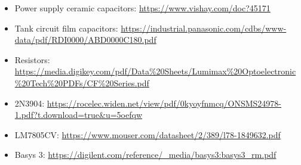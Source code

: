 \documentclass[12pt]{article}
\numberwithin{figure}{section}
\numberwithin{equation}{section}
\begin{document}
\begin{itemize} 
    \item Power supply ceramic capacitors: \url{https://www.vishay.com/doc?45171} 
    \item Tank circuit film capacitors: \url{https://industrial.panasonic.com/cdbs/www-data/pdf/RDI0000/ABD0000C180.pdf}
    \item Resistors: \url{https://media.digikey.com/pdf/Data%20Sheets/Lumimax%20Optoelectronic%20Tech%20PDFs/CF%20Series.pdf}
    \item 2N3904: \url{https://rocelec.widen.net/view/pdf/0kyoyfnmcq/ONSMS24978-1.pdf?t.download=true&u=5oefqw} 
    \item LM7805CV: \url{https://www.mouser.com/datasheet/2/389/l78-1849632.pdf}
    \item Basys 3: \url{https://digilent.com/reference/_media/basys3:basys3_rm.pdf}
\end{itemize}
\end{document}

